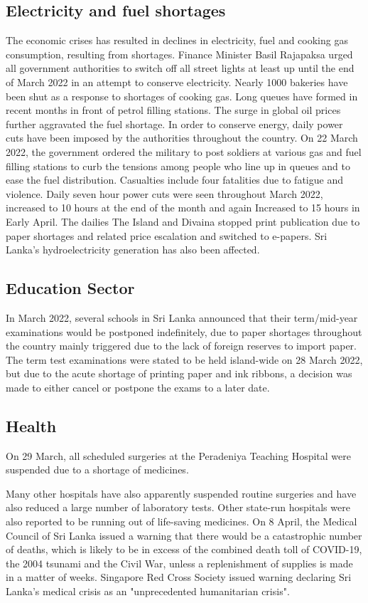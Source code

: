 \documentclass[a4paper,12pt]{article}
\begin{document}
\subsection{Electricity and fuel shortages}
The economic crises has resulted in declines in electricity, fuel and cooking gas consumption, resulting from shortages. Finance Minister Basil Rajapaksa urged all government authorities to switch off all street lights at least up until the end of March 2022 in an attempt to conserve electricity. Nearly 1000 bakeries have been shut as a response to shortages of cooking gas. Long queues have formed in recent months in front of petrol filling stations. The surge in global oil prices further aggravated the fuel shortage. In order to conserve energy, daily power cuts have been imposed by the authorities throughout the country. On 22 March 2022, the government ordered the military to post soldiers at various gas and fuel filling stations to curb the tensions among people who line up in queues and to ease the fuel distribution. Casualties include four fatalities due to fatigue and violence. Daily seven hour power cuts were seen throughout March 2022, increased to 10 hours at the end of the month and again Increased to 15 hours in Early April. The dailies The Island and Divaina stopped print publication due to paper shortages and related price escalation and switched to e-papers. Sri Lanka's hydroelectricity generation has also been affected.

\subsection{Education Sector}
In March 2022, several schools in Sri Lanka announced that their term/mid-year examinations would be postponed indefinitely, due to paper shortages throughout the country mainly triggered due to the lack of foreign reserves to import paper. The term test examinations were stated to be held island-wide on 28 March 2022, but due to the acute shortage of printing paper and ink ribbons, a decision was made to either cancel or postpone the exams to a later date.
\subsection{Health}
On 29 March, all scheduled surgeries at the Peradeniya Teaching Hospital were suspended due to a shortage of medicines.

Many other hospitals have also apparently suspended routine surgeries and have also reduced a large number of laboratory tests. Other state-run hospitals were also reported to be running out of life-saving medicines. On 8 April, the Medical Council of Sri Lanka issued a warning that there would be a catastrophic number of deaths, which is likely to be in excess of the combined death toll of COVID-19, the 2004 tsunami and the Civil War, unless a replenishment of supplies is made in a matter of weeks. Singapore Red Cross Society issued warning declaring Sri Lanka's medical crisis as an "unprecedented humanitarian crisis".
\end{document}
